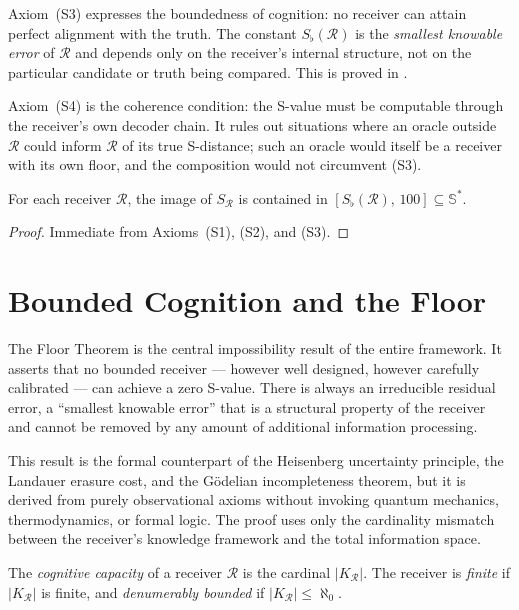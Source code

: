 \begin{remark}
Axiom~(S3) expresses the boundedness of cognition: no receiver can attain
perfect alignment with the truth.  The constant $S_\flat(\mathcal{R})$ is the
\emph{smallest knowable error} of $\mathcal{R}$ and depends only on the
receiver's internal structure, not on the particular candidate or truth being
compared.  This is proved in .

Axiom~(S4) is the coherence condition: the S-value must be computable
through the receiver's own decoder chain.  It rules out situations where an
oracle outside $\mathcal{R}$ could inform $\mathcal{R}$ of its true S-distance;
such an oracle would itself be a receiver with its own floor, and the
composition would not circumvent (S3).
\end{remark}

\begin{lemma}
\label{lem:image-S}
For each receiver $\mathcal{R}$, the image of $S_{\mathcal{R}}$ is contained in
$[S_\flat(\mathcal{R}),\, 100] \subseteq \mathbb{S}^{*}$.
\end{lemma}

\begin{proof}
Immediate from Axioms~(S1), (S2), and (S3).
\end{proof}

\section{Bounded Cognition and the Floor}
\label{sec:bounded-cognition}

The Floor Theorem is the central impossibility result of the entire
framework.  It asserts that no bounded receiver — however well designed,
however carefully calibrated — can achieve a zero S-value.  There is always
an irreducible residual error, a ``smallest knowable error'' that is a
structural property of the receiver and cannot be removed by any amount of
additional information processing.

This result is the formal counterpart of the Heisenberg uncertainty
principle, the Landauer erasure cost, and the G\"{o}delian incompleteness
theorem, but it is derived from purely observational axioms without invoking
quantum mechanics, thermodynamics, or formal logic.  The proof uses only the
cardinality mismatch between the receiver's knowledge framework and the total
information space.

\begin{definition}
\label{def:cog-cap}
The \emph{cognitive capacity} of a receiver $\mathcal{R}$ is the cardinal
$|K_{\mathcal{R}}|$.  The receiver is \emph{finite} if $|K_{\mathcal{R}}|$
is finite, and \emph{denumerably bounded} if $|K_{\mathcal{R}}| \leq \aleph_0$.
\end{definition}

